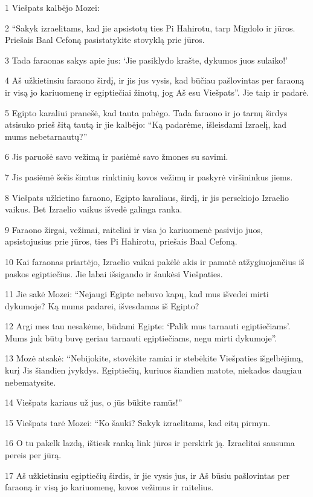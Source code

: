 \par 1 Viešpats kalbėjo Mozei: 
\par 2 “Sakyk izraelitams, kad jie apsistotų ties Pi Hahirotu, tarp Migdolo ir jūros. Priešais Baal Cefoną pasistatykite stovyklą prie jūros. 
\par 3 Tada faraonas sakys apie jus: ‘Jie pasiklydo krašte, dykumos juos sulaiko!’ 
\par 4 Aš užkietinsiu faraono širdį, ir jis jus vysis, kad būčiau pašlovintas per faraoną ir visą jo kariuomenę ir egiptiečiai žinotų, jog Aš esu Viešpats”. Jie taip ir padarė. 
\par 5 Egipto karaliui pranešė, kad tauta pabėgo. Tada faraono ir jo tarnų širdys atsisuko prieš šitą tautą ir jie kalbėjo: “Ką padarėme, išleisdami Izraelį, kad mums nebetarnautų?” 
\par 6 Jis paruošė savo vežimą ir pasiėmė savo žmones su savimi. 
\par 7 Jis pasiėmė šešis šimtus rinktinių kovos vežimų ir paskyrė viršininkus jiems. 
\par 8 Viešpats užkietino faraono, Egipto karaliaus, širdį, ir jis persekiojo Izraelio vaikus. Bet Izraelio vaikus išvedė galinga ranka. 
\par 9 Faraono žirgai, vežimai, raiteliai ir visa jo kariuomenė pasivijo juos, apsistojusius prie jūros, ties Pi Hahirotu, priešais Baal Cefoną. 
\par 10 Kai faraonas priartėjo, Izraelio vaikai pakėlė akis ir pamatė atžygiuojančius iš paskos egiptiečius. Jie labai išsigando ir šaukėsi Viešpaties. 
\par 11 Jie sakė Mozei: “Nejaugi Egipte nebuvo kapų, kad mus išvedei mirti dykumoje? Ką mums padarei, išvesdamas iš Egipto? 
\par 12 Argi mes tau nesakėme, būdami Egipte: ‘Palik mus tarnauti egiptiečiams’. Mums juk būtų buvę geriau tarnauti egiptiečiams, negu mirti dykumoje”. 
\par 13 Mozė atsakė: “Nebijokite, stovėkite ramiai ir stebėkite Viešpaties išgelbėjimą, kurį Jis šiandien įvykdys. Egiptiečių, kuriuos šiandien matote, niekados daugiau nebematysite. 
\par 14 Viešpats kariaus už jus, o jūs būkite ramūs!” 
\par 15 Viešpats tarė Mozei: “Ko šauki? Sakyk izraelitams, kad eitų pirmyn. 
\par 16 O tu pakelk lazdą, ištiesk ranką link jūros ir perskirk ją. Izraelitai sausuma pereis per jūrą. 
\par 17 Aš užkietinsiu egiptiečių širdis, ir jie vysis jus, ir Aš būsiu pašlovintas per faraoną ir visą jo kariuomenę, kovos vežimus ir raitelius. 
